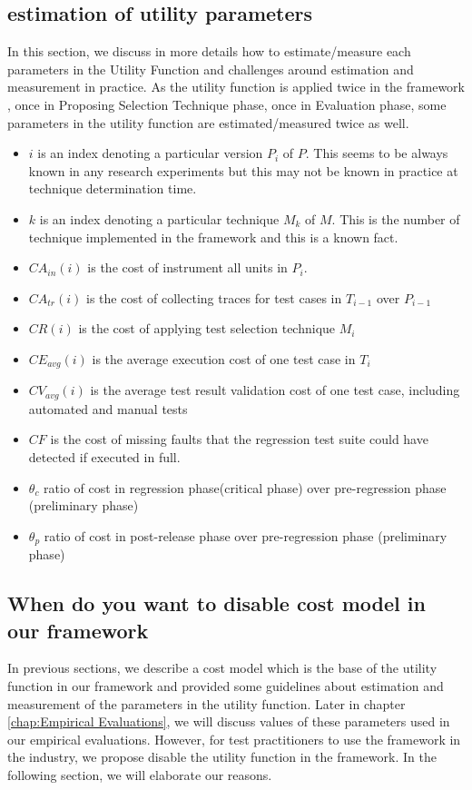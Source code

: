 \subsection{estimation of utility parameters}
In this section, we discuss in more details how to estimate/measure each
parameters in the Utility Function and challenges around estimation and
measurement in practice. As the utility function is applied twice in the
framework , once in Proposing Selection Technique phase, once in Evaluation
phase, some parameters in the utility function are estimated/measured twice as
well. 

\begin{itemize}
  \item $i$ is an index denoting a particular version $P_i$ of $P$. This seems
  to be always known in any research experiments but this may not be known in
  practice at technique determination time. 
  \item $k$ is an index denoting a particular technique $M_k$ of $M$. This is
  the number of technique implemented in the framework and this is a known fact.
  \item $CA_{in}(i)$ is the cost of instrument all units in $P_i$.
  \item $CA_{tr}(i)$ is the cost of collecting traces for test cases in
  $T_{i-1}$ over $P_{i-1}$ 
  \item $CR(i)$ is the cost of applying test selection technique $M_i$
  \item $CE_{avg}(i)$ is the average execution cost of one test case in $T_i$
  \item $CV_{avg}(i)$ is the average test result validation cost of one test
  case, including automated and manual tests
  \item $CF$ is the cost of missing faults that the regression test suite
  could have detected if executed in full.
  \item $\theta_c$ ratio of cost in regression phase(critical phase) over
  pre-regression phase (preliminary phase)
  \item $\theta_p$ ratio of cost in post-release phase over pre-regression phase
  (preliminary phase)
\end{itemize}


\subsection{When do you want to disable cost model in our framework}
In previous sections, we describe a cost model which is the base of the utility
function in our framework and provided some guidelines about estimation and measurement of the parameters
in the utility function. Later in chapter \ref{chap:Empirical Evaluations}, we
will discuss values of these parameters used in our empirical evaluations.
However, for test practitioners to use the framework in the industry, we
propose disable the utility function in the framework. In the
following section, we will elaborate our reasons.

